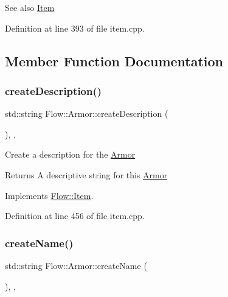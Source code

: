 \begin{DoxySeeAlso}{See also}
\hyperlink{class_flow_1_1_item}{Item} 
\end{DoxySeeAlso}


Definition at line 393 of file item.\+cpp.



\subsection{Member Function Documentation}
\hypertarget{class_flow_1_1_armor_a4774ee68bb4814fd645bbedf19958719}{}\label{class_flow_1_1_armor_a4774ee68bb4814fd645bbedf19958719} 
\subsubsection{\texorpdfstring{create\+Description()}{createDescription()}}
{\footnotesize\ttfamily std\+::string Flow\+::\+Armor\+::create\+Description (\begin{DoxyParamCaption}{ }\end{DoxyParamCaption})\hspace{0.3cm}{\ttfamily [override]}, {\ttfamily [protected]}, {\ttfamily [virtual]}}

Create a description for the \hyperlink{class_flow_1_1_armor}{Armor} \begin{DoxyReturn}{Returns}
A descriptive string for this \hyperlink{class_flow_1_1_armor}{Armor} 
\end{DoxyReturn}


Implements \hyperlink{class_flow_1_1_item_abf20647ff13aa4c761828d2d5508c504}{Flow\+::\+Item}.



Definition at line 456 of file item.\+cpp.

\hypertarget{class_flow_1_1_armor_af8706de01294d876610c7a821e39dc84}{}\label{class_flow_1_1_armor_af8706de01294d876610c7a821e39dc84} 
\subsubsection{\texorpdfstring{create\+Name()}{createName()}}
{\footnotesize\ttfamily std\+::string Flow\+::\+Armor\+::create\+Name (\begin{DoxyParamCaption}{ }\end{DoxyParamCaption})\hspace{0.3cm}{\ttfamily [override]}, {\ttfamily [protected]}, {\ttfamily [virtual]}}


